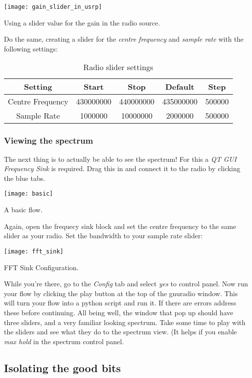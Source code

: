 \centrefigurestart
\texttt{[image: gain\_slider\_in\_usrp]}
\caption{Using a slider value for the gain in the radio source.}
\centrefigureend

Do the same, creating a slider for the \textit{centre frequency} and \textit{sample rate} with the following settings:

\begin{table}[H]
\begin{tabular}{ccccc}
\hline
Setting & Start & Stop & Default & Step \\ \hline
\multicolumn{1}{|c|}{Centre Frequency} & \multicolumn{1}{c|}{430000000} & \multicolumn{1}{c|}{440000000} & \multicolumn{1}{c|}{435000000} & \multicolumn{1}{c|}{500000} \\ \hline
Sample Rate & 1000000 & 10000000 & 2000000 & 500000 \\ \hline
\end{tabular}
\caption{Radio slider settings}
\end{table}

\subsubsection{Viewing the spectrum}
The next thing is to actually be able to see the spectrum! For this a \textit{QT GUI Frequency Sink} is required. Drag this in and connect it to the radio by clicking the blue tabs.

\centrefigurestart
\texttt{[image: basic]}
\caption{A basic flow.}
\centrefigureend

Again, open the frequecy sink block and set the centre frequency to the same slider as your radio. Set the bandwidth to your sample rate slider:

\centrefigurestart
\texttt{[image: fft\_sink]}
\caption{FFT Sink Configuration.}
\centrefigureend

While you're there, go to the \textit{Config} tab and select \textit{yes} to control panel. Now run your flow by clicking the play button at the top of the gnuradio window. This will turn your flow into a python script and run it. If there are errors address these before continuing. All being well, the window that pop up should have three sliders, and a very familiar looking spectrum. Take some time to play with the sliders and see what they do to the spectrum view. (It helps if you enable \textit{max hold} in the spectrum control panel. 

\subsection{Isolating the good bits}

